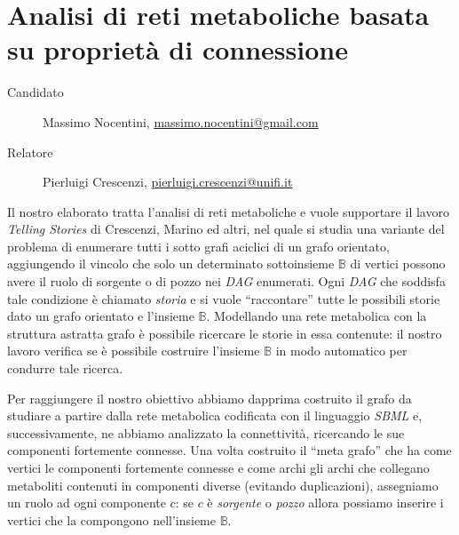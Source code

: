 \documentclass[twoside,openright,titlepage,fleqn,
headinclude,11pt,a4paper,BCOR5mm,footinclude ]{scrbook}
\begin{document}
\frenchspacing
\raggedbottom
{}
\pagestyle{plain}
%
\pagestyle{scrheadings}

\lstset{
	language = java
	, numbers = left 
	, basicstyle=\sffamily%
	, tabsize=2
	, captionpos=b
	, breaklines=true
	, showspaces=false
	, showstringspaces=false
}

\chapter*{Analisi di reti metaboliche basata su propriet\`a di
  connessione}
\begin{description}
\item[Candidato] Massimo Nocentini, \url{massimo.nocentini@gmail.com}
\item[Relatore] Pierluigi Crescenzi, \url{pierluigi.crescenzi@unifi.it}
\end{description}
Il nostro elaborato tratta l'analisi di reti metaboliche e vuole
supportare il lavoro \emph{Telling Stories} di Crescenzi, Marino ed
altri, nel quale si studia una variante del problema di enumerare
tutti i sotto grafi aciclici di un grafo orientato, aggiungendo il
vincolo che solo un determinato sottoinsieme $\mathbb{B}$ di vertici
possono avere il ruolo di sorgente o di pozzo nei \emph{DAG}
enumerati. Ogni \emph{DAG} che soddisfa tale condizione \`e chiamato
\emph{storia} e si vuole ``raccontare'' tutte le possibili storie dato
un grafo orientato e l'insieme $\mathbb{B}$. Modellando una rete
metabolica con la struttura astratta grafo \`e possibile ricercare le
storie in essa contenute: il nostro lavoro verifica se \`e possibile
costruire l'insieme $\mathbb{B}$ in modo automatico per condurre tale
ricerca.

Per raggiungere il nostro obiettivo abbiamo dapprima costruito il
grafo da studiare a partire dalla rete metabolica codificata con il
linguaggio \emph{SBML} e, successivamente, ne abbiamo analizzato la
connettivit\`a, ricercando le sue componenti fortemente connesse. Una
volta costruito il ``meta grafo'' che ha come vertici le componenti
fortemente connesse e come archi gli archi che collegano metaboliti
contenuti in componenti diverse (evitando duplicazioni), assegniamo un
ruolo ad ogni componente $c$: se $c$ \`e \emph{sorgente} o
\emph{pozzo} allora possiamo inserire i vertici che la compongono
nell'insieme $\mathbb{B}$.
\end{document}
